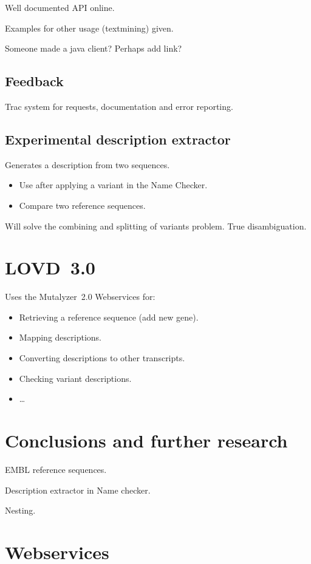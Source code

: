 \documentclass{article}
\begin{document}
Well documented API online.

Examples for other usage (textmining) given.

Someone made a java client? Perhaps add link?

\subsection{Feedback}
Trac system for requests, documentation and error reporting.

\subsection{Experimental description extractor}
Generates a description from two sequences.
\begin{itemize}
  \item Use after applying a variant in the Name Checker.
  \item Compare two reference sequences.
\end{itemize}

Will solve the combining and splitting of variants problem. True
disambiguation.

\section{LOVD~3.0}
Uses the Mutalyzer~2.0 Webservices for:
\begin{itemize}
  \item Retrieving a reference sequence (add new gene).
  \item Mapping descriptions.
  \item Converting descriptions to other transcripts.
  \item Checking variant descriptions.
  \item \ldots
\end{itemize}

\section{Conclusions and further research}\label{conclusion}
EMBL reference sequences.

Description extractor in Name checker.

Nesting.

{}


\appendix

\section{Webservices}
\end{document}
